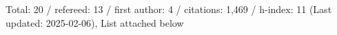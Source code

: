 Total: 20 / refereed: 13 / first author: 4 / citations: 1,469 / h-index: 11 (Last updated: 2025-02-06), List attached below